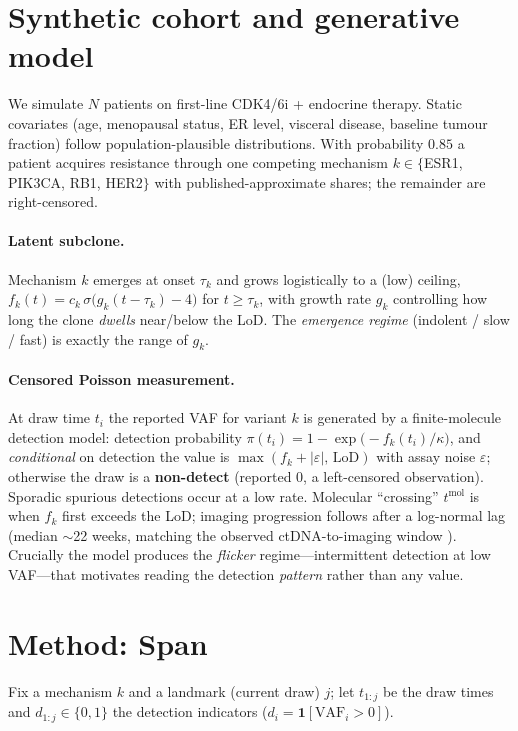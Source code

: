 \documentclass[11pt]{article}
\newcommand{\1}{\mathbf{1}}
\begin{document}
\section{Synthetic cohort and generative model}\label{sec:gen}
We simulate $N$ patients on first-line CDK4/6i + endocrine therapy. Static
covariates (age, menopausal status, ER level, visceral disease, baseline tumour
fraction) follow population-plausible distributions. With probability $0.85$ a
patient acquires resistance through one competing mechanism $k\in\{$ESR1, PIK3CA,
RB1, HER2$\}$ with published-approximate shares; the remainder are right-censored.

\paragraph{Latent subclone.} Mechanism $k$ emerges at onset $\tau_k$ and grows
logistically to a (low) ceiling,
$f_k(t)=c_k\,\sigma\!\big(g_k (t-\tau_k)-4\big)$ for $t\ge\tau_k$, with growth
rate $g_k$ controlling how long the clone \emph{dwells} near/below the LoD. The
\emph{emergence regime} (indolent / slow / fast) is exactly the range of $g_k$.

\paragraph{Censored Poisson measurement.} At draw time $t_i$ the reported VAF for
variant $k$ is generated by a finite-molecule detection model: detection
probability $\pi(t_i)=1-\exp\!\big(-f_k(t_i)/\kappa\big)$, and \emph{conditional}
on detection the value is $\max(f_k+|\varepsilon|,\,\mathrm{LoD})$ with assay
noise $\varepsilon$; otherwise the draw is a \textbf{non-detect} (reported $0$, a
left-censored observation). Sporadic spurious detections occur at a low rate.
Molecular ``crossing'' $t^{\mathrm{mol}}$ is when $f_k$ first exceeds the LoD;
imaging progression follows after a log-normal lag (median $\sim$22 weeks,
matching the observed ctDNA-to-imaging window \citep{abbosh2023tracerx}). Crucially
the model produces the \emph{flicker} regime---intermittent detection at low
VAF---that motivates reading the detection \emph{pattern} rather than any value.

\section{Method: Span}\label{sec:method}
Fix a mechanism $k$ and a landmark (current draw) $j$; let $t_{1:j}$ be the draw
times and $d_{1:j}\in\{0,1\}$ the detection indicators ($d_i=\1[\text{VAF}_i>0]$).
\end{document}
